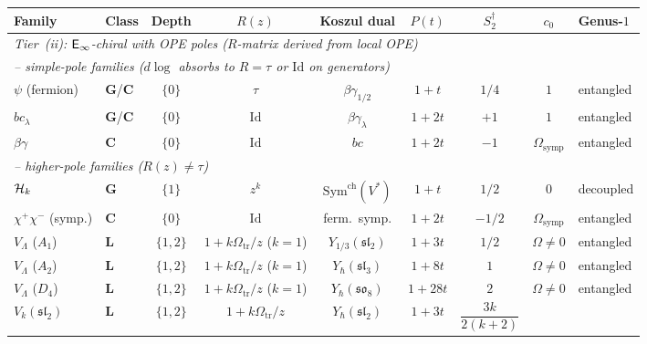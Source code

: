 \begin{computation}
\begin{center}
\small
\renewcommand{\arraystretch}{1.5}
\setlength{\tabcolsep}{4pt}
\begin{tabular}{llccccccl}
\toprule
\textbf{Family}
 & \textbf{Class}
 & \textbf{Depth}
 & $R(z)$
 & \textbf{Koszul dual}
 & $P(t)$
 & $S_2^\dagger$
 & $c_0$
 & \textbf{Genus-$1$} \\
\midrule
\multicolumn{9}{l}{\textit{Tier~\textup{(ii)}: $\mathsf{E}_{\infty}$-chiral with
 OPE poles \textup{(}$R$-matrix derived from local OPE\textup{)}}} \\[2pt]
\multicolumn{9}{l}{\quad\textit{-- simple-pole families
 \textup{(}$d\log$ absorbs to $R = \tau$ or $\mathrm{Id}$
 on generators\textup{)}}} \\[2pt]
$\psi$ (fermion)
 & $\mathbf{G}$/$\mathbf{C}$
 & $\{0\}$
 & $\tau$
 & $\beta\gamma_{1/2}$
 & $1{+}t$
 & $1/4$
 & $1$
 & entangled \\[3pt]
$bc_\lambda$
 & $\mathbf{G}$/$\mathbf{C}$
 & $\{0\}$
 & $\mathrm{Id}$
 & $\beta\gamma_\lambda$
 & $1{+}2t$
 & $+1$
 & $1$
 & entangled \\[3pt]
$\beta\gamma$
 & $\mathbf{C}$
 & $\{0\}$
 & $\mathrm{Id}$
 & $bc$
 & $1{+}2t$
 & $-1$
 & $\Omega_{\mathrm{symp}}$
 & entangled \\[3pt]
\multicolumn{9}{l}{\quad\textit{-- higher-pole families
 \textup{(}$R(z) \ne \tau$\textup{)}}} \\[2pt]
$\mathcal{H}_k$
 & $\mathbf{G}$
 & $\{1\}$
 & $z^k$
 & $\mathrm{Sym}^{\mathrm{ch}}(V^*)$
 & $1{+}t$
 & $1/2$
 & $0$
 & decoupled \\[3pt]
$\chi^+\chi^-$ (symp.)
 & $\mathbf{C}$
 & $\{0\}$
 & $\mathrm{Id}$
 & ferm.\ symp.
 & $1{+}2t$
 & $-1/2$
 & $\Omega_{\mathrm{symp}}$
 & entangled \\[3pt]
$V_\Lambda$ ($A_1$)
 & $\mathbf{L}$
 & $\{1,2\}$
 & $1{+}k\Omega_{\mathrm{tr}}/z$ ($k{=}1$)
 & $Y_{1/3}(\mathfrak{sl}_2)$
 & $1{+}3t$
 & $1/2$
 & $\Omega\ne 0$
 & entangled \\[3pt]
$V_\Lambda$ ($A_2$)
 & $\mathbf{L}$
 & $\{1,2\}$
 & $1{+}k\Omega_{\mathrm{tr}}/z$ ($k{=}1$)
 & $Y_\hbar(\mathfrak{sl}_3)$
 & $1{+}8t$
 & $1$
 & $\Omega\ne 0$
 & entangled \\[3pt]
$V_\Lambda$ ($D_4$)
 & $\mathbf{L}$
 & $\{1,2\}$
 & $1{+}k\Omega_{\mathrm{tr}}/z$ ($k{=}1$)
 & $Y_\hbar(\mathfrak{so}_8)$
 & $1{+}28t$
 & $2$
 & $\Omega\ne 0$
 & entangled \\[3pt]
$V_k(\mathfrak{sl}_2)$
 & $\mathbf{L}$
 & $\{1,2\}$
 & $1{+}k\Omega_{\mathrm{tr}}/z$
 & $Y_\hbar(\mathfrak{sl}_2)$
 & $1{+}3t$
 & $\dfrac{3k}{2(k{+}2)}$

\end{tabular}
\end{center}
\end{computation}
